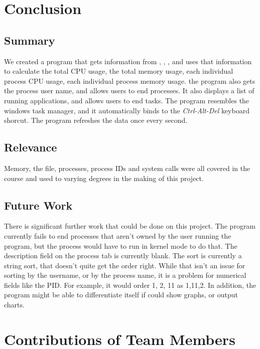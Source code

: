 \documentclass[12pt]{article}
\begin{document}
	\section{Conclusion}
	
	\subsection{Summary}
	We created a program that gets information from , , ,  and uses that information to calculate the total CPU usage, the total memory usage, each individual process CPU usage, each individual process memory usage. the program also gets the process user name, and allows users to end processes. It also displays a list of running applications, and allows users to end tasks. The program resembles the windows task manager, and it automatically binds to the \emph{Ctrl-Alt-Del} keyboard shorcut. The program refreshes the data once every second.
	
	\subsection{Relevance}
	Memory, the  file, processes, process IDs and system calls were all covered in the course and used to varying degrees in the making of this project.
	
	\subsection{Future Work}
	There is significant further work that could be done on this project.
The program currently fails to end processes that aren't owned by the user running the program, but the process would have to run in kernel mode to do that.
The description field on the process tab is currently blank. The sort is currently a string sort, that doesn't quite get the order right. While that isn't an issue for sorting by the username, or by the process name, it is a problem for numerical fields like the PID. For example, it would order 1, 2, 11 as 1,11,2. In addition, the program might be able to differentiate itself if could show graphs, or output charts. 
	
	
	\setcounter{secnumdepth}{0}
	\section{Contributions of Team Members}
\end{document}
